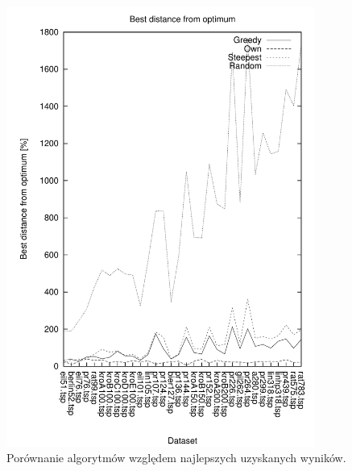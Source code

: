 \begin{figure}
\begin{center}
\includegraphics[width=0.9\textwidth]{wykresy/best_com}
\end{center}
\caption{Porównanie algorytmów względem najlepszych uzyskanych wyników.}
\label{best_com}
\end{figure}


